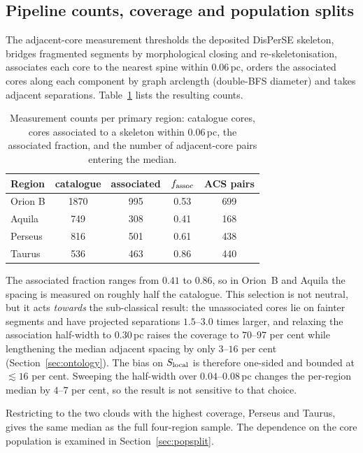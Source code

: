 \documentclass[usenatbib,twoside,twocolumn]{mnras}
\begin{document}
\subsection{Pipeline counts, coverage and population splits}
\label{sec:nnpipeline}

The adjacent-core measurement thresholds the deposited DisPerSE skeleton, bridges fragmented segments by morphological closing and re-skeletonisation, associates each core to the nearest spine within $0.06$\,pc, orders the associated cores along each component by graph arclength (double-BFS diameter) and takes adjacent separations. Table~\ref{tab:nnpipeline} lists the resulting counts.

\begin{table}
\caption{Measurement counts per primary region: catalogue cores, cores associated to a skeleton within $0.06$\,pc, the associated fraction, and the number of adjacent-core pairs entering the median.}
\label{tab:nnpipeline}
\footnotesize
\setlength{\tabcolsep}{5pt}
\begin{tabular}{lcccc}
\toprule
Region & catalogue & associated & $f_{\rm assoc}$ & ACS pairs \\
\midrule
Orion B & 1870 & 995 & 0.53 & 699 \\
Aquila  &  749 & 308 & 0.41 & 168 \\
Perseus &  816 & 501 & 0.61 & 438 \\
Taurus  &  536 & 463 & 0.86 & 440 \\
\bottomrule
\end{tabular}
\end{table}

The associated fraction ranges from $0.41$ to $0.86$, so in Orion~B and Aquila the spacing is measured on roughly half the catalogue. This selection is not neutral, but it acts \emph{towards} the sub-classical result: the unassociated cores lie on fainter segments and have projected separations $1.5$--$3.0$ times larger, and relaxing the association half-width to $0.30$\,pc raises the coverage to $70$--$97$ per cent while lengthening the median adjacent spacing by only $3$--$16$ per cent (Section~\ref{sec:ontology}). The bias on $S_{\rm local}$ is therefore one-sided and bounded at $\lesssim16$ per cent. Sweeping the half-width over $0.04$--$0.08$\,pc changes the per-region median by $4$--$7$ per cent, so the result is not sensitive to that choice.

Restricting to the two clouds with the highest coverage, Perseus and Taurus, gives the same median as the full four-region sample. The dependence on the core population is examined in Section~\ref{sec:popsplit}.
\end{document}
